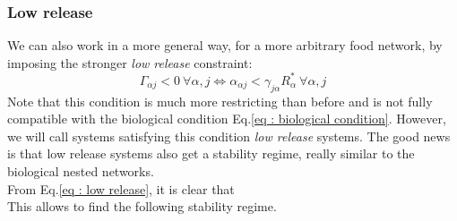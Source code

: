 \documentclass[12pt, titlepage]{report}
\begin{document}
			\subsubsection{Low release}
			We can also work in a more general way, for a more arbitrary food network, by imposing the stronger \textit{low release} constraint:
			\begin{equation}
				\Gamma_{\alpha j} < 0 \ \forall \alpha, j \iff \alpha_{\alpha j} < \gamma_{j \alpha}R^*_\alpha \ \forall \alpha, j \label{eq : low release}
			\end{equation}
			Note that this condition is much more restricting than before and is not fully compatible with the biological condition Eq.\eqref{eq : biological condition}. However, we will call systems satisfying this condition \textit{low release} systems. The good news is that low release systems also get a stability regime, really similar to the biological nested networks.\\

			From Eq.\eqref{eq : low release}, it is clear that
			\\

			This allows to find the following stability regime.\\

			\\
\end{document}

